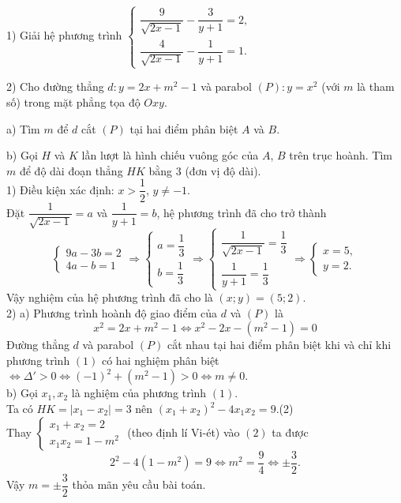 \begin{ex}%
1) Giải hệ phương trình $\begin{cases}\dfrac{9}{\sqrt{2x-1}}-\dfrac{3}{y+1}=2,\\ \dfrac{4}{\sqrt{2x-1}}-\dfrac{1}{y+1}=1.\end{cases}$

2) Cho đường thẳng $d\colon y=2x+m^2-1$ và parabol $(P)\colon y=x^2$ (với $m$ là tham số) trong mặt phẳng tọa độ $Oxy$.

a) Tìm $m$ để $d$ cắt $(P)$ tại hai điểm phân biệt $A$ và $B$.

b) Gọi $H$ và $K$ lần lượt là hình chiếu vuông góc của $A$, $B$ trên trục hoành. Tìm $m$ để độ dài đoạn thẳng $HK$ bằng $3$ (đơn vị độ dài).
	\loigiai
	{\text{}\\
1) Điều kiện xác định: $x>\dfrac{1}{2}$, $y\ne -1$.\\
Đặt $\dfrac{1}{\sqrt{2x-1}}=a$ và $\dfrac{1}{y+1}=b$, hệ phương trình đã cho trở thành $$\begin{cases}9a-3b=2\\ 4a-b=1\end{cases}\Rightarrow \begin{cases}a=\dfrac{1}{3}\\ b=\dfrac{1}{3}\end{cases}\Rightarrow \begin{cases}\dfrac{1}{\sqrt{2x-1}}=\dfrac{1}{3}\\ \dfrac{1}{y+1}=\dfrac{1}{3}\end{cases}\Rightarrow \begin{cases}x=5,\\ y=2.\end{cases}$$
Vậy nghiệm của hệ phương trình đã cho là $(x;y)=(5;2).$\\
2) a) Phương trình hoành độ giao điểm của $d$ và $(P)$ là \[x^2=2x+m^2-1\Leftrightarrow x^2-2x-(m^2-1)=0\tag{1}\]
Đường thẳng $d$ và parabol $(P)$ cắt nhau tại hai điểm phân biệt khi và chỉ khi phương trình $(1)$ có hai nghiệm phân biệt $\Leftrightarrow \Delta '>0\Leftrightarrow (-1)^2+(m^2-1)>0 \Leftrightarrow m\ne 0$.\\
b) Gọi $x_1,x_2$ là nghiệm của phương trình $(1)$.\\
Ta có $HK=|x_1-x_2|=3$ nên $\left(x_1+x_2\right)^2-4x_1x_2=9$.\hfill(2)\\
Thay $\begin{cases}x_1+x_2=2\\ x_1x_2=1-m^2\end{cases}$ (theo định lí Vi-ét) vào $(2)$ ta được $$2^2-4(1-m^2)=9\Leftrightarrow m^2=\dfrac{9}{4}\Leftrightarrow \pm \dfrac{3}{2}.$$
Vậy $m=\pm \dfrac{3}{2}$ thỏa mãn yêu cầu bài toán.
}
\end{ex}

